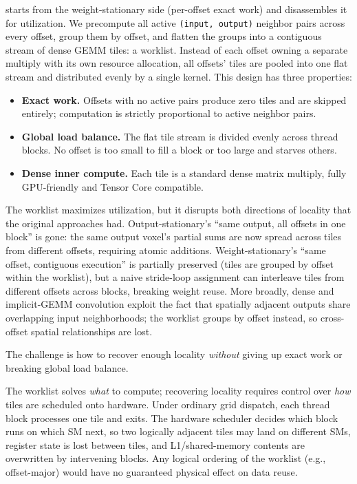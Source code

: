 \sysname starts from the weight-stationary side (per-offset exact work)
and disassembles it for utilization.
We precompute all active \texttt{(input, output)} neighbor pairs across
every offset, group them by offset, and flatten the groups into a
contiguous stream of dense GEMM tiles: a worklist.
Instead of each offset owning a separate multiply with its own resource
allocation, all offsets' tiles are pooled into one flat stream and
distributed evenly by a single kernel.
This design has three properties:
%
\begin{itemize}
  \item \textbf{Exact work.}
        Offsets with no active pairs produce zero tiles and are skipped
        entirely; computation is strictly proportional to active neighbor
        pairs.
  \item \textbf{Global load balance.}
        The flat tile stream is divided evenly across thread blocks.
        No offset is too small to fill a block or too large and starves
        others.
  \item \textbf{Dense inner compute.}
        Each tile is a standard dense matrix multiply, fully GPU-friendly
        and Tensor Core compatible.
\end{itemize}

The worklist maximizes utilization, but it disrupts both directions of
locality that the original approaches had.
Output-stationary's ``same output, all offsets in one block'' is gone:
the same output voxel's partial sums are now spread across tiles from
different offsets, requiring atomic additions.
Weight-stationary's ``same offset, contiguous execution'' is partially
preserved (tiles are grouped by offset within the worklist), but a naive
stride-loop assignment can interleave tiles from different offsets across
blocks, breaking weight reuse.
More broadly, dense and implicit-GEMM convolution exploit the fact that
spatially adjacent outputs share overlapping input neighborhoods; the
worklist groups by offset instead, so cross-offset spatial relationships
are lost.

The challenge is how to recover enough locality \emph{without} giving up
exact work or breaking global load balance.

The worklist solves \emph{what} to compute; recovering locality requires
control over \emph{how} tiles are scheduled onto hardware.
Under ordinary grid dispatch, each thread block processes one tile and
exits.
The hardware scheduler decides which block runs on which SM next, so
two logically adjacent tiles may land on different SMs, register state
is lost between tiles, and L1/shared-memory contents are overwritten by
intervening blocks.
Any logical ordering of the worklist (e.g., offset-major) would have no
guaranteed physical effect on data reuse.

